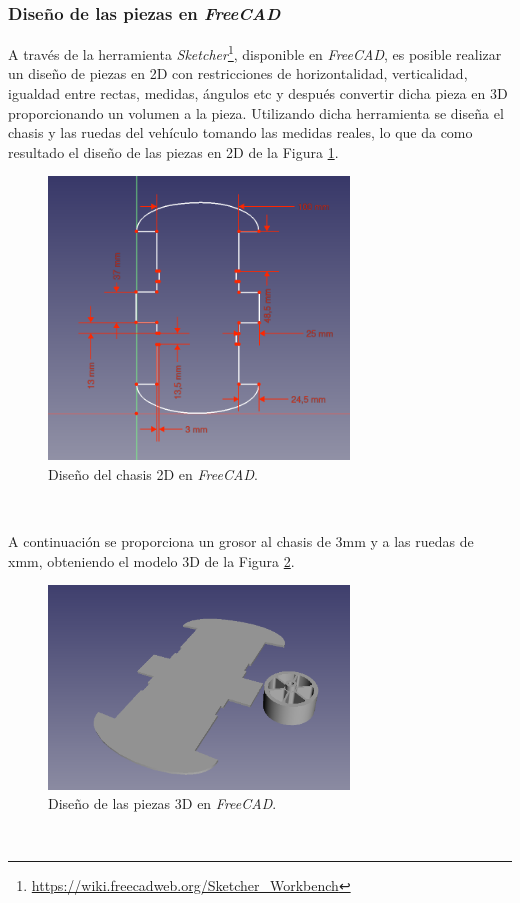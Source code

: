\subsubsection{Diseño de las piezas en \textit{FreeCAD}}

A través de la herramienta \textit{Sketcher}\footnote{\url{https://wiki.freecadweb.org/Sketcher_Workbench}}, disponible en \textit{FreeCAD}, es posible realizar un diseño de piezas en 2D con restricciones de horizontalidad, verticalidad, igualdad entre rectas, medidas, ángulos etc y después convertir dicha pieza en 3D proporcionando un volumen a la pieza. Utilizando dicha herramienta se diseña el chasis y las ruedas del vehículo tomando las medidas reales, lo que da como resultado el diseño de las piezas en 2D de la Figura \ref{fig:design2Dfreecad}.\\

\begin{figure} [h!]
	\begin{center}
		\includegraphics[width=8cm]{figs/sketchFreecad}
	\end{center}
	\caption{Diseño del chasis 2D en \textit{FreeCAD}.}
	\label{fig:design2Dfreecad}
\end{figure}\

A continuación se proporciona un grosor al chasis de 3mm y a las ruedas de xmm, obteniendo el modelo 3D de la Figura \ref{fig:design3Dfreecad}.\\

\begin{figure} [h!]
	\begin{center}
		\includegraphics[width=8cm]{figs/freecad}
	\end{center}
	\caption{Diseño de las piezas 3D en \textit{FreeCAD}.}
	\label{fig:design3Dfreecad}
\end{figure}\

